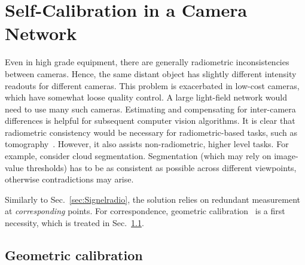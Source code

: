 \documentclass[runningheads]{llncs}
\begin{document}
\section{Self-Calibration in a Camera Network}
\label{sec:muticalib}

Even in high grade equipment, there are generally radiometric inconsistencies between cameras. Hence, the same distant object has slightly different intensity readouts for different cameras. This problem is exacerbated in low-cost cameras, which have somewhat loose quality control. A large light-field network would need to use many such cameras. Estimating and compensating for inter-camera differences is helpful for subsequent computer vision algorithms. It is clear that radiometric consistency would be necessary for radiometric-based tasks, such as tomography~\cite{Aides:13}. However, it also assists non-radiometric, higher level tasks. For example, consider cloud segmentation. Segmentation (which may rely on image-value thresholds) has to be as consistent as possible across different viewpoints, otherwise contradictions may arise.

Similarly to Sec.~\ref{sec:Signelradio}, the solution relies on redundant measurement at {\em corresponding} points.   For correspondence, geometric calibration~\cite{Seiz2002} is a first necessity, which is treated in Sec.~\ref{sec:geometry}.


\subsection{Geometric calibration}
\label{sec:geometry}
\end{document}
